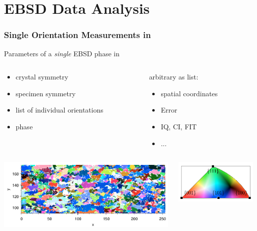 \section{EBSD Data Analysis}

\begin{frame}[fragile]
  \frametitle{Single Orientation Measurements in \MTEX}

  Parameters of a \textit{single} EBSD phase in \mtex

  \medskip

  \begin{columns}

    \begin{column}{6cm}

      \begin{itemize}
      \item crystal symmetry
      \item specimen symmetry
      \item list of individual orientations
      \item phase
      \end{itemize}

    \end{column}

    \begin{column}{5.5cm}

      arbitrary as list:
      \begin{itemize}
      \item spatial coordinates
      \item Error
      \item IQ, CI, FIT
      \item ...
      \end{itemize}
    \end{column}
  \end{columns}

  \bigskip

  \begin{columns}
    \begin{column}{8cm}
      \includegraphics[height=3.5cm]{pic/ebsd.pdf}
    \end{column}
    \begin{column}{4cm}
      \includegraphics[width=4cm]{pic/ebsdtriangle.pdf}
    \end{column}
  \end{columns}
\end{frame}

